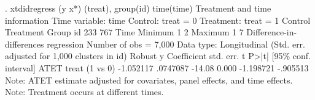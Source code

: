 . xtdidregress (y x*) (treat), group(id) time(time)
{\smallskip}
Treatment and time information
{\smallskip}
Time variable: time
Control:       treat = 0
Treatment:     treat = 1
             {\VBAR}   Control  Treatment
Group        {\VBAR}
          id {\VBAR}       233        767
Time         {\VBAR}
     Minimum {\VBAR}         1          2
     Maximum {\VBAR}         1          7
{\smallskip}
Difference-in-differences regression                     Number of obs = 7,000
Data type: Longitudinal
{\smallskip}
                                 (Std. err. adjusted for 1,000 clusters in id)
             {\VBAR}               Robust
           y {\VBAR} Coefficient  std. err.      t    P>|t|     [95\% conf. interval]
ATET         {\VBAR}
       treat {\VBAR}
   (1 vs 0)  {\VBAR}  -1.052117   .0747087   -14.08   0.000    -1.198721    -.905513
Note: ATET estimate adjusted for covariates, panel effects, and time effects.
Note: Treatment occurs at different times.
